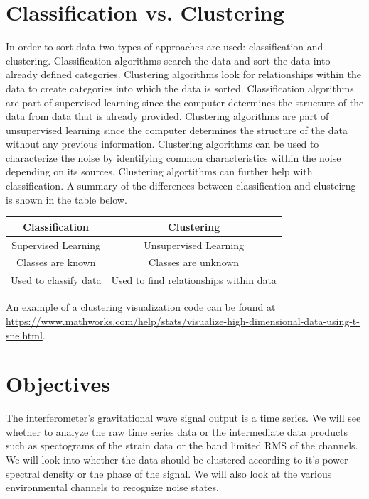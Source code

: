 \documentclass[colorlinks=true,pdfstartview=FitV,linkcolor=blue,
            citecolor=red,urlcolor=magenta]{ligodoc}
\begin{document}
\section{Classification vs. Clustering}

In order to sort data two types of approaches are used: classification and clustering. Classification algorithms search the data and sort the data into already defined categories. Clustering algorithms look for relationships within the data to create categories into which the data is sorted. Classification algorithms are part of supervised learning since the computer determines the structure of the data from data that is already provided. Clustering algorithms are part of unsupervised learning since the computer determines the structure of the data without any previous information.  Clustering algorithms can be used to characterize the noise by identifying common characteristics within the noise depending on its sources. Clustering algortithms can further help with classification. A summary of the differences between classification and clusteirng is shown in the table below.

\begin{center}
 \begin{tabular}{|c | c|} 
 \hline
 Classification & Clustering\\ [0.5ex] 
 \hline\hline
 Supervised Learning & Unsupervised Learning\\ 
 \hline
 Classes are known & Classes are unknown\\
 \hline
 Used to classify data & Used to find relationships within data\\
 \hline
\end{tabular}
\end{center}

\par An example of  a clustering visualization code can be found at \url{https://www.mathworks.com/help/stats/visualize-high-dimensional-data-using-t-sne.html}.

\section{Objectives}  
The interferometer's gravitational wave signal output is a time series. We will see whether to analyze the raw time series data or the 
intermediate data products such as spectograms of the strain data or the band limited RMS of the channels. We will look into whether the data should be clustered according to it's power spectral density or the phase of the signal. We will also look at the various environmental channels to recognize noise states. 
\end{document}
